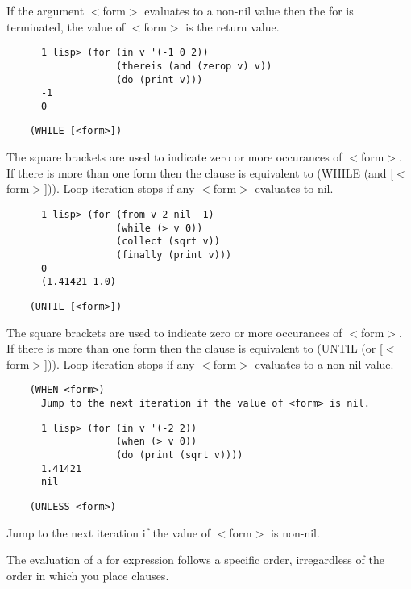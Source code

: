       If the argument $<$form$>$ evaluates to a non-nil value then the for
      is terminated, the value of $<$form$>$ is the return value.

\begin{verbatim}
      1 lisp> (for (in v '(-1 0 2))
                   (thereis (and (zerop v) v))
                   (do (print v)))
      -1
      0
\end{verbatim}

\begin{verbatim}
    (WHILE [<form>])
\end{verbatim}
      The square brackets are used to indicate zero or more occurances of
      $<$form$>$.  If there is more than one form then the clause is equivalent
      to (WHILE (and [$<$form$>$])).  Loop iteration stops if any $<$form$>$ evaluates
      to nil.


\begin{verbatim}
      1 lisp> (for (from v 2 nil -1)
                   (while (> v 0))
                   (collect (sqrt v))
                   (finally (print v)))
      0
      (1.41421 1.0)
\end{verbatim}

\begin{verbatim}
    (UNTIL [<form>])
\end{verbatim}
      The square brackets are used to indicate zero or more occurances of
      $<$form$>$.  If there is more than one form then the clause is
      equivalent to (UNTIL (or [$<$form$>$])).  Loop iteration stops if any
      $<$form$>$ evaluates to a non nil value.

\begin{verbatim}
    (WHEN <form>)
      Jump to the next iteration if the value of <form> is nil.
\end{verbatim}

\begin{verbatim}
      1 lisp> (for (in v '(-2 2))
                   (when (> v 0))
                   (do (print (sqrt v))))
      1.41421
      nil
\end{verbatim}

\begin{verbatim}
    (UNLESS <form>)
\end{verbatim}
      Jump to the next iteration if the value of $<$form$>$ is non-nil.

  The  evaluation  of a for expression follows a specific order,
irregardless of the order in which you place clauses.


